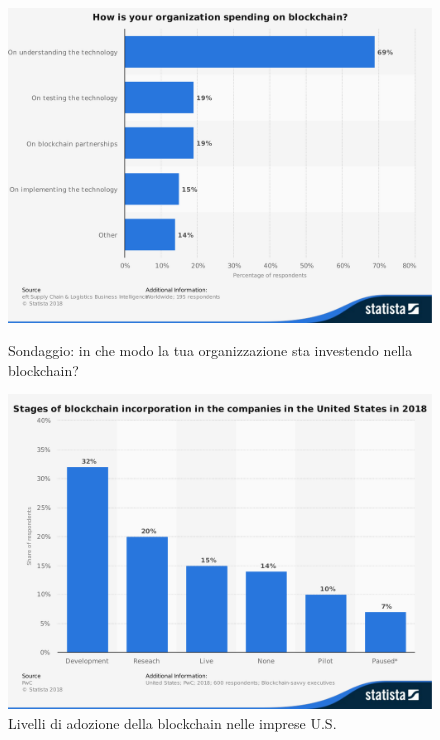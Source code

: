\begin{figure}[H]
	\begin{minipage}{0.48\textwidth}
		\centering
		\includegraphics[width=1\linewidth]{images/chap_intro/top-spending-in-supply-chain-industry.pdf}
		\caption{Sondaggio: in che modo la tua organizzazione sta investendo nella blockchain?
			\cite{top-spending-in-supply-chain-industry}}
	\end{minipage}\hfill
	\begin{minipage}{0.48\textwidth}
		\centering
		\includegraphics[width=1\linewidth]{images/chap_intro/stages-of-blockchain-incorporation.pdf}
		\caption{Livelli di adozione della blockchain nelle imprese U.S.
			\cite{stages-of-blockchain-incorporation}}
	\end{minipage}
\end{figure}

